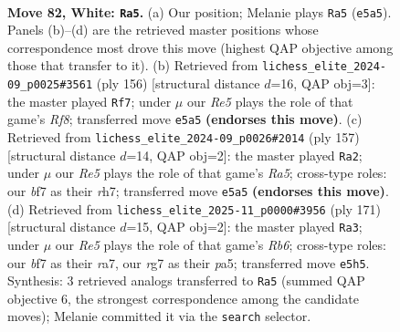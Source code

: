 \documentclass[11pt]{article}
\begin{document}
\clearpage

\begin{figure}[p]\centering
\begin{subfigure}{0.46\textwidth}\centering
\resizebox{\linewidth}{!}{%
\newchessgame
\chessboard[
  setfen={1R6/3k1br1/8/4R3/1P6/2K5/8/8 w - - 37 82},
  showmover=false,
  pgfstyle=straightmove, color=movearrow, markmove={e5-a5}
]}
\caption{}
\end{subfigure}\hfill
\begin{subfigure}{0.46\textwidth}\centering
\resizebox{\linewidth}{!}{%
\newchessgame
\chessboard[
  setfen={5R2/2P5/3K4/8/8/7b/4k3/8 w - - 7 79},
  showmover=false,
  pgfstyle=straightmove, color=movearrow, markmove={f8-f7}
]}
\caption{}
\end{subfigure}
\\[4pt]
\begin{subfigure}{0.46\textwidth}\centering
\resizebox{\linewidth}{!}{%
\newchessgame
\chessboard[
  setfen={8/7R/8/8/r3pk2/2K5/8/8 b - - 3 79},
  showmover=false,
  pgfstyle=straightmove, color=movearrow, markmove={a4-a2}
]}
\caption{}
\end{subfigure}\hfill
\begin{subfigure}{0.46\textwidth}\centering
\resizebox{\linewidth}{!}{%
\newchessgame
\chessboard[
  setfen={8/R7/5k2/P5p1/8/1r6/5K2/8 b - - 2 86},
  showmover=false,
  pgfstyle=straightmove, color=movearrow, markmove={b3-a3}
]}
\caption{}
\end{subfigure}
\caption{\textbf{Move 82, White: \texttt{Ra5}.} (a) Our position; Melanie plays \texttt{Ra5} (\texttt{e5a5}). Panels (b)--(d) are the retrieved master positions whose correspondence most drove this move (highest QAP objective among those that transfer to it). (b) Retrieved from \texttt{lichess\_elite\_2024-09\_p0025\#3561} (ply 156) [structural distance $d$=16, QAP obj=3]: the master played \texttt{Rf7}; under $\mu$ our \emph{Re5} plays the role of that game's \emph{Rf8}; transferred move \texttt{e5a5} \textbf{(endorses this move)}. (c) Retrieved from \texttt{lichess\_elite\_2024-09\_p0026\#2014} (ply 157) [structural distance $d$=14, QAP obj=2]: the master played \texttt{Ra2}; under $\mu$ our \emph{Re5} plays the role of that game's \emph{Ra5}; cross-type roles: our \emph{b}f7 as their \emph{r}h7; transferred move \texttt{e5a5} \textbf{(endorses this move)}. (d) Retrieved from \texttt{lichess\_elite\_2025-11\_p0000\#3956} (ply 171) [structural distance $d$=15, QAP obj=2]: the master played \texttt{Ra3}; under $\mu$ our \emph{Re5} plays the role of that game's \emph{Rb6}; cross-type roles: our \emph{b}f7 as their \emph{r}a7, our \emph{r}g7 as their \emph{p}a5; transferred move \texttt{e5h5}. Synthesis: 3 retrieved analogs transferred to \texttt{Ra5} (summed QAP objective 6, the strongest correspondence among the candidate moves); Melanie committed it via the \texttt{search} selector.}
\label{fig:thought-m162}
\end{figure}
\end{document}
